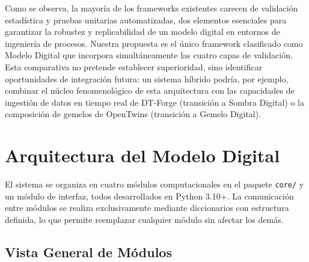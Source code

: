 \documentclass[10pt,letterpaper,twocolumn]{article}
\begin{document}
Como se observa, la mayoría de los frameworks existentes carecen de validación estadística y pruebas unitarias automatizadas, dos elementos esenciales para garantizar la robustez y replicabilidad de un modelo digital en entornos de ingeniería de procesos. Nuestra propuesta es el único framework clasificado como Modelo Digital que incorpora simultáneamente las cuatro capas de validación. Esta comparativa no pretende establecer superioridad, sino identificar oportunidades de integración futura: un sistema híbrido podría, por ejemplo, combinar el núcleo fenomenológico de esta arquitectura con las capacidades de ingestión de datos en tiempo real de DT-Forge (transición a Sombra Digital) o la composición de gemelos de OpenTwins (transición a Gemelo Digital).

\section{Arquitectura del Modelo Digital}

El sistema se organiza en cuatro módulos computacionales en el paquete \texttt{core/} y un módulo de interfaz, todos desarrollados en Python 3.10+. La comunicación entre módulos se realiza exclusivamente mediante diccionarios con estructura definida, lo que permite reemplazar cualquier módulo sin afectar los demás.

\subsection{Vista General de Módulos}
\end{document}
